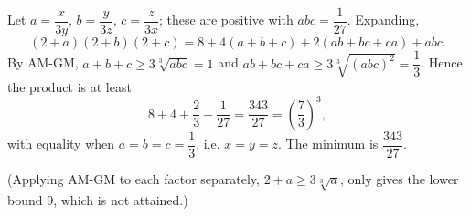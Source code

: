 Let $a=\dfrac{x}{3y}$, $b=\dfrac{y}{3z}$, $c=\dfrac{z}{3x}$; these are positive with $abc=\dfrac1{27}$. Expanding,
\[(2+a)(2+b)(2+c)=8+4(a+b+c)+2(ab+bc+ca)+abc.\]
By AM-GM, $a+b+c\ge3\sqrt[3]{abc}=1$ and $ab+bc+ca\ge3\sqrt[3]{(abc)^2}=\dfrac13$. Hence the product is at least
\[8+4+\dfrac23+\dfrac1{27}=\dfrac{343}{27}=\left(\dfrac73\right)^3,\]
with equality when $a=b=c=\dfrac13$, i.e. $x=y=z$. The minimum is $\boxed{\dfrac{343}{27}}$.

(Applying AM-GM to each factor separately, $2+a\ge3\sqrt[3]a$, only gives the lower bound $9$, which is not attained.)
